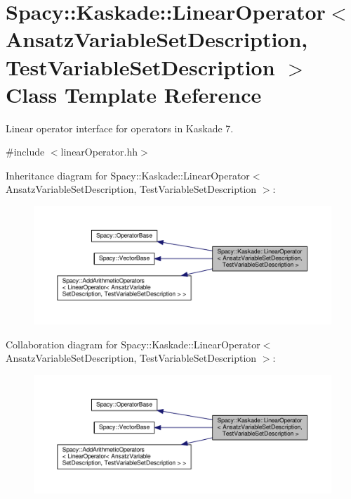 \hypertarget{classSpacy_1_1Kaskade_1_1LinearOperator}{}\section{Spacy\+:\+:Kaskade\+:\+:Linear\+Operator$<$ Ansatz\+Variable\+Set\+Description, Test\+Variable\+Set\+Description $>$ Class Template Reference}
\label{classSpacy_1_1Kaskade_1_1LinearOperator}


Linear operator interface for operators in Kaskade 7.  




{\ttfamily \#include $<$linear\+Operator.\+hh$>$}



Inheritance diagram for Spacy\+:\+:Kaskade\+:\+:Linear\+Operator$<$ Ansatz\+Variable\+Set\+Description, Test\+Variable\+Set\+Description $>$\+:
\nopagebreak
\begin{figure}[H]
\begin{center}
\leavevmode
\includegraphics[width=350pt]{classSpacy_1_1Kaskade_1_1LinearOperator__inherit__graph}
\end{center}
\end{figure}


Collaboration diagram for Spacy\+:\+:Kaskade\+:\+:Linear\+Operator$<$ Ansatz\+Variable\+Set\+Description, Test\+Variable\+Set\+Description $>$\+:
\nopagebreak
\begin{figure}[H]
\begin{center}
\leavevmode
\includegraphics[width=350pt]{classSpacy_1_1Kaskade_1_1LinearOperator__coll__graph}
\end{center}
\end{figure}
